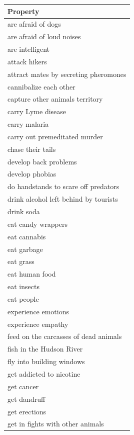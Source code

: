 \documentclass[floatsintext,doc]{apa6}
\begin{document}
\begingroup\fontsize{11pt}{12pt}\selectfont
\begin{longtable}{ |p{3in}|}
  \hline
{\bfseries Property} \\ 
  \hline
are afraid of dogs \\ 
   \hline
are afraid of loud noises \\ 
   \hline
are intelligent \\ 
   \hline
attack hikers \\ 
   \hline
attract mates by secreting pheromones \\ 
   \hline
cannibalize each other \\ 
   \hline
capture other animals territory \\ 
   \hline
carry Lyme disease \\ 
   \hline
carry malaria \\ 
   \hline
carry out premeditated murder \\ 
   \hline
chase their tails \\ 
   \hline
develop back problems \\ 
   \hline
develop phobias \\ 
   \hline
do handstands to scare off predators \\ 
   \hline
drink alcohol left behind by tourists \\ 
   \hline
drink soda \\ 
   \hline
eat candy wrappers \\ 
   \hline
eat cannabis \\ 
   \hline
eat garbage \\ 
   \hline
eat grass \\ 
   \hline
eat human food \\ 
   \hline
eat insects \\ 
   \hline
eat people \\ 
   \hline
experience emotions \\ 
   \hline
experience empathy \\ 
   \hline
feed on the carcasses of dead animals \\ 
   \hline
fish in the Hudson River \\ 
   \hline
fly into building windows \\ 
   \hline
get addicted to nicotine \\ 
   \hline
get cancer \\ 
   \hline
get dandruff \\ 
   \hline
get erections \\ 
   \hline
get in fights with other animals \\ 

\end{longtable}
\end{document}
